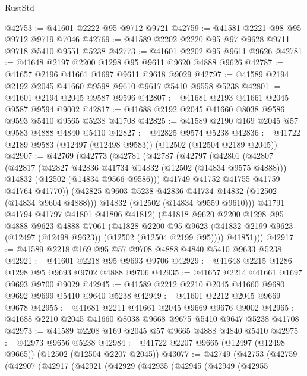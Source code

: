 \begin{lexlean}{RustStd}
\begin{coremodule}
@42753 := @41601 @2222 @95 @9712 @9721
@42759 := @41581 @2221 @98 @95 @9712 @9719 @7046
@42769 := @41589 @2202 @2220 @95 @97 @9628 @9711 @9718 @5410 @9551 @5238
@42773 := @41601 @2202 @95 @9611 @9626
@42781 := @41648 @2197 @2200 @1298 @95 @9611 @9620 @4888 @9626
@42787 := @41657 @2196 @41661 @1697 @9611 @9618 @9029
@42797 := @41589 @2194 @2192 @2045 @41660 @9598 @9610 @9617 @5410 @9558 @5238
@42801 := @41601 @2194 @2045 @9587 @9596
@42807 := @41681 @2193 @41661 @2045 @9587 @9594 @9002
@42817 := @41688 @2192 @2045 @41660 @8038 @9586 @9593 @5410 @9565 @5238 @41708
@42825 := @41589 @2190 @169 @2045 @57 @9583 @4888 @4840 @5410
@42827 := @42825 @9574 @5238
@42836 := @41722 @2189 @9583 (@12497 (@12498 @9583)) (@12502 (@12504 @2189 @2045))
@42907 := @42769
    (@42773
      (@42781
        (@42787
          (@42797
            (@42801
              (@42807
                (@42817
                  (@42827 @42836 @41734 @14832 (@12502 (@14834 @9575 @4888)))
                  @14832
                  (@12502 (@14834 @9566 @9586)))
                @41749
                @41752
                @41755
                @41759
                @41764
                @41770))
            (@42825 @9603 @5238 @42836 @41734 @14832 (@12502 (@14834 @9604 @4888)))
            @14832
            (@12502 (@14834 @9559 @9610)))
          @41791
          @41794
          @41797
          @41801
          @41806
          @41812)
        (@41818
          @9620
          @2200
          @1298
          @95
          @4888
          @9623
          @4888
          @7061
          (@41828
            @2200
            @95
            @9623
            (@41832 @2199 @9623 (@12497 (@12498 @9623)) (@12502 (@12504 @2199 @95))))
          @41851)))
@42917 := @41589 @2218 @169 @95 @57 @9708 @4888 @4840 @5410 @9633 @5238
@42921 := @41601 @2218 @95 @9693 @9706
@42929 := @41648 @2215 @1286 @1298 @95 @9693 @9702 @4888 @9706
@42935 := @41657 @2214 @41661 @1697 @9693 @9700 @9029
@42945 := @41589 @2212 @2210 @2045 @41660 @9680 @9692 @9699 @5410 @9640 @5238
@42949 := @41601 @2212 @2045 @9669 @9678
@42955 := @41681 @2211 @41661 @2045 @9669 @9676 @9002
@42965 := @41688 @2210 @2045 @41660 @8038 @9668 @9675 @5410 @9647 @5238 @41708
@42973 := @41589 @2208 @169 @2045 @57 @9665 @4888 @4840 @5410
@42975 := @42973 @9656 @5238
@42984 := @41722 @2207 @9665 (@12497 (@12498 @9665)) (@12502 (@12504 @2207 @2045))
@43077 := @42749
    (@42753
      (@42759
        (@42907
          (@42917
            (@42921
              (@42929
                (@42935
                  (@42945
                    (@42949
                      (@42955

\end{coremodule}
\end{lexlean}
